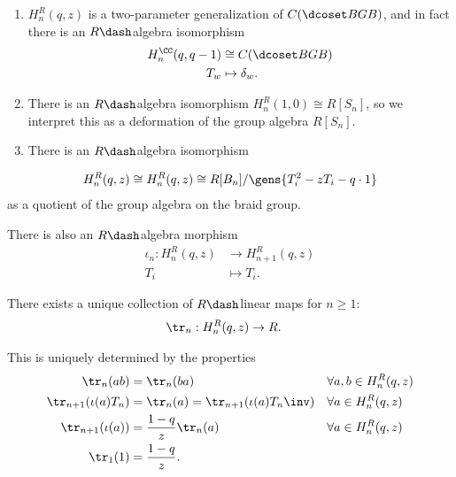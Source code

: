 \begin{remark}

\hfill

\begin{enumerate}
\def\labelenumi{\arabic{enumi}.}
\item
  \(H_n^R(q, z)\) is a two-parameter generalization of
  \(C(\dcoset B G B)\), and in fact there is an \(R\dash\)algebra
  isomorphism
  \begin{align*}
  H_n^\CC(q, q-1) &\cong C(\dcoset B G B)\\
  T_w &\mapsto \delta_w
  .\end{align*}
\item
  There is an \(R\dash\)algebra isomorphism
  \(H_n^R(1, 0) \cong R[S_n]\), so we interpret this as a deformation of
  the group algebra \(R[S_n]\).
\item
  There is an \(R\dash\)algebra isomorphism
\end{enumerate}

\begin{align*}
  H_n^R(q, z) \cong H_n^R(q, z) \cong R[B_n] / \gens{T_i^2 - zT_i - q\cdot 1}
  \end{align*} as a quotient of the group algebra on the braid group.

There is also an \(R\dash\)algebra morphism
\begin{align*}
\iota_n: H_n^R(q, z) &\to H_{n+1}^R(q, z) \\
T_i &\mapsto T_i
.\end{align*}

\end{remark}

\begin{theorem}[?]

There exists a unique collection of \(R\dash\)linear maps for
\(n\geq 1\):
\begin{align*}
\tr_n: H_n^R(q, z) &\to R
.\end{align*}

This is uniquely determined by the properties
\begin{align*}
\tr_n(ab) &= \tr_n(ba) 
&& \forall a,b\in H_n^R(q ,z) \\
\tr_{n+1}(\iota(a) T_n) &= \tr_n(a) = \tr_{n+1} (\iota(a) T_n\inv) 
&&\forall a\in H_n^R(q, z) \\
\tr_{n+1}(\iota(a)) &= {1 - q \over z} \tr_n(a) 
&&\forall a \in H_n^R(q, z) \\
\tr_1(1) &= {1 -q \over z}
.\end{align*}

\end{theorem}

